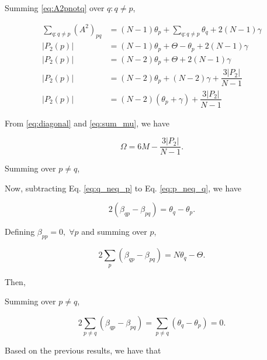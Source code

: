 \documentclass{article}
\begin{document}
Summing \ref{eq:A2pnotq} over $q:q\neq p$,

\begin{align}
    \sum_{q:q\neq p} (A^2)_{pq} &= (N-1) \theta_p + \sum_{q:q\neq p} \theta_q + 2(N-1)\gamma \nonumber\\ 
    |P_2(p)| &= (N-1) \theta_p + \Theta - \theta_p + 2(N-1)\gamma \nonumber\\ 
    |P_2(p)| &= (N-2) \theta_p + \Theta + 2(N-1)\gamma \nonumber \\
    |P_2(p)| &= (N-2) \theta_p + (N-2)\gamma + \dfrac{3 |P_2|}{N-1} \nonumber \\
    |P_2(p)| &= (N-2) (\theta_p + \gamma) + \dfrac{3 |P_2|}{N-1}
\end{align}

From \ref{eq:diagonal} and \ref{eq:sum_mu}, we have 

\begin{equation}
    \Omega = 6M - \dfrac{3 |P_2|}{N-1}.
\end{equation}



Summing over $p\neq q$,



Now, subtracting Eq. \ref{eq:q_neq_p} to Eq. \ref{eq:p_neq_q}, we have

\begin{equation}\label{eq:betas}
     2 (\beta_{qp} - \beta_{pq}) = \theta_q - \theta_p.
\end{equation}

Defining $\beta_{pp} = 0,\;\forall p$ and summing over $p$,

\begin{equation}
    2 \sum_p (\beta_{qp}-\beta_{pq}) = N\theta_q - \Theta.
\end{equation}

Then,


Summing over $p \neq q$,

\begin{equation}
    2 \sum_{p\neq q} (\beta_{qp} - \beta_{pq}) = \sum_{p\neq q} (\theta_q - \theta_p) = 0.
\end{equation}

Based on the previous results, we have that
\end{document}
